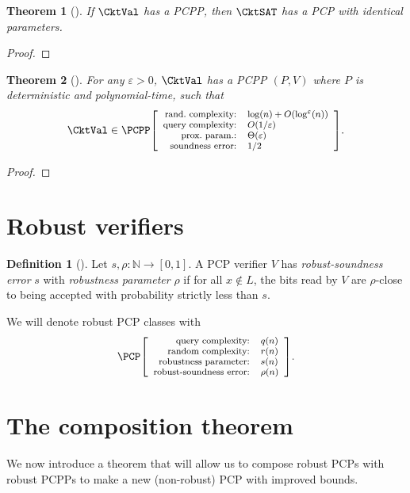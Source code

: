 \documentclass[english,12pt]{reedthesis}
\theoremstyle{plain}
\newtheorem{thm}{Theorem}[section]
\theoremstyle{definition}
\newtheorem{defn}[defn]{Definition}
\theoremstyle{remark}
\newcommand{\pcpp}[4]{%
  \ensuremath%
  \mleft[{\footnotesize\begin{array}{r l}
    \text{rand.\ complexity:} & #1 \\
    \text{query complexity:} & #2 \\
    \text{prox.\ param.:} & #3 \\
    \text{soundness error:} & #4
  \end{array}}\mright]%
}
\newcommand{\pcpr}[4]{%
  \ensuremath%
  \mleft[{\footnotesize\begin{array}{r l}
    \text{query complexity:} & #1 \\
    \text{random complexity:} & #2 \\
    \text{robustness parameter:} & #3 \\
    \text{robust-soundness error:} & #4
  \end{array}}\mright]%
}
\begin{document}
\begin{thm}[{\cite[Prop.\ 2.4]{BGHSV06}}]\label{thm:cktval-cktsat}
  If $\CktVal$ has a PCPP, then $\CktSAT$ has a PCP with identical parameters.
\end{thm}

\begin{proof}
\end{proof}

\begin{thm}[{\cite[Theorem 3.2]{BGHSV06}}]\label{thm:ckt-val-pcpp}
  For any $\varepsilon > 0$, $\CktVal$ has a PCPP $(P, V)$ where $P$ is deterministic and
  polynomial-time, such that
  \[
    \CktVal \in \PCPP\pcpp{\log(n) + O(\log^{\varepsilon}(n))}{O(1/\varepsilon)}{\Theta(\varepsilon)}{1/2}.
  \]
\end{thm}

\begin{proof}
\end{proof}

\section{Robust verifiers}\label{sec:robust-verifier}

\begin{defn}[{\cite[Def.\ 2.6]{BGHSV06}}]\label{def:robust-verifer}
  Let $s, \rho\colon \mathbb{N} \rightarrow [0, 1]$. A PCP verifier $V$ has
  \emph{robust-soundness error} $s$ with \emph{robustness parameter} $\rho$ if for
  all $x \notin L$, the bits read by $V$ are $\rho$-close to being accepted with
  probability strictly less than $s$.
\end{defn}

We will denote robust PCP classes with
\[
  \PCP\pcpr{q(n)}{r(n)}{s(n)}{\rho(n)}.
\]

\section{The composition theorem}\label{sec:comp-theorem}

We now introduce a theorem that will allow us to compose robust PCPs with robust
PCPPs to make a new (non-robust) PCP with improved bounds.
\end{document}
